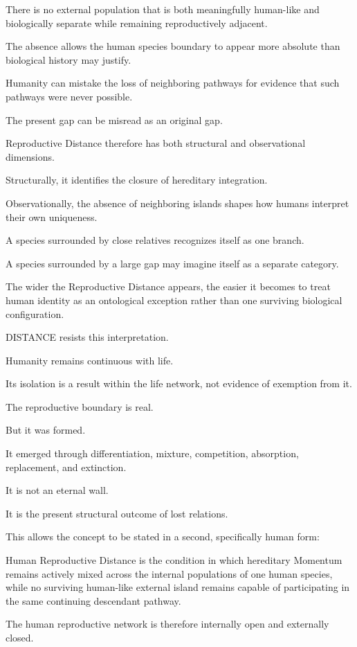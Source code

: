 There is no external population that is both meaningfully human-like and biologically separate while remaining reproductively adjacent.

The absence allows the human species boundary to appear more absolute than biological history may justify.

Humanity can mistake the loss of neighboring pathways for evidence that such pathways were never possible.

The present gap can be misread as an original gap.

Reproductive Distance therefore has both structural and observational dimensions.

Structurally, it identifies the closure of hereditary integration.

Observationally, the absence of neighboring islands shapes how humans interpret their own uniqueness.

A species surrounded by close relatives recognizes itself as one branch.

A species surrounded by a large gap may imagine itself as a separate category.

The wider the Reproductive Distance appears, the easier it becomes to treat human identity as an ontological exception rather than one surviving biological configuration.

DISTANCE resists this interpretation.

Humanity remains continuous with life.

Its isolation is a result within the life network, not evidence of exemption from it.

The reproductive boundary is real.

But it was formed.

It emerged through differentiation, mixture, competition, absorption, replacement, and extinction.

It is not an eternal wall.

It is the present structural outcome of lost relations.

This allows the concept to be stated in a second, specifically human form:

Human Reproductive Distance is the condition in which hereditary Momentum remains actively mixed across the internal populations of one human species, while no surviving human-like external island remains capable of participating in the same continuing descendant pathway.

The human reproductive network is therefore internally open and externally closed.

